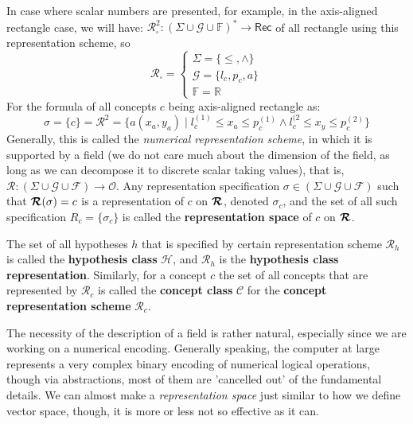 In case where scalar numbers are presented, for example, in the axis-aligned rectangle case, we will have: $\bm{\mathcal{R}}^{2}_{\square}:(\Sigma\cup \mathcal{G}\cup\mathbb{F})^{*}\to \mathsf{Rec}$ of all rectangle using this representation scheme, so 
    \begin{equation}
        \bm{\mathcal{R}}_{\square} = \begin{cases}
            \Sigma = \{\leq, \land \}\\
            \mathcal{G} = \{l_{c}, p_{c}, a\}\\
            \mathbb{F} = \mathbb{R}
        \end{cases}
    \end{equation}
    For the formula of all concepts $c$ being axis-aligned rectangle as: 
    \begin{equation}
        \sigma = \{c\} = \bm{\mathcal{R}}^{2} = \{a(x_{a},y_{a}) \mid l_{c}^{(1)} \leq x_{a}\leq p_{c}^{(1)}\land l_{c}^{(2} \leq x_{y}\leq p_{c}^{(2)}\}
    \end{equation}
    Generally, this is called the \textit{numerical representation scheme}, in which it is supported by a field (we do not care much about the dimension of the field, as long as we can decompose it to discrete scalar taking values), that is, $\bm{\mathcal{R}}:(\Sigma \cup \mathcal{G}\cup \mathcal{F})\to \mathcal{O}$. Any representation specification $\sigma\in (\Sigma \cup \mathcal{G}\cup \mathcal{F})$ such that $\bm{\mathcal{R}}(\sigma) = c$ is a representation of $c$ on $\bm{\mathcal{R}}$, denoted $\sigma_{c}$, and the set of all such specification $R_{c}=\{\sigma_{c}\}$ is called the \textbf{representation space} of $c$ on $\bm{\mathcal{R}}$.
    
    The set of all hypotheses $h$ that is specified by certain representation scheme $\bm{\mathcal{R}}_{h}$ is called the \textbf{hypothesis class} $\mathcal{H}$, and $\bm{\mathcal{R}}_{h}$ is the \textbf{hypothesis class representation}. Similarly, for a concept $c$ the set of all concepts that are represented by $\bm{\mathcal{R}}_{c}$ is called the \textbf{concept class} $\mathcal{C}$ for the \textbf{concept representation scheme} $\bm{\mathcal{R}}_{c}$. 

The necessity of the description of a field is rather natural, especially since we are working on a numerical encoding. Generally speaking, the computer at large represents a very complex binary encoding of numerical logical operations, though via abstractions, most of them are 'cancelled out' of the fundamental details. We can almost make a \textit{representation space} just similar to how we define vector space, though, it is more or less not so effective as it can. 

